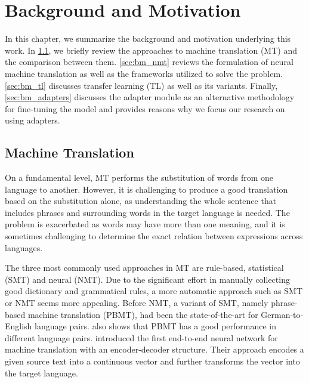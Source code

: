 \chapter{Background and Motivation}

In this chapter, we summarize the background and motivation underlying this work. In \cref{sec:bm_smt}, we briefly review the approaches to machine translation (MT) and the comparison between them.
\cref{sec:bm_nmt} reviews the formulation of neural machine translation as well as the frameworks utilized to solve the problem.
\cref{sec:bm_tl} discusses transfer learning (TL) as well as its variants.
Finally, \cref{sec:bm_adapters} discusses the adapter module as an alternative methodology for fine-tuning the model and provides reasons why we focus our research on using adapters.

\section{Machine Translation}
\label{sec:bm_smt}
On a fundamental level, MT performs the substitution of words from one language to another. However, it is challenging to produce a good translation based on the substitution alone, as understanding the whole sentence that includes phrases and surrounding words in the target language is needed. The problem is exacerbated as words may have more than one meaning, and it is sometimes challenging to determine the exact relation between expressions across languages.

The three most commonly used approaches in MT are rule-based, statistical (SMT) and neural (NMT). Due to the significant effort in manually collecting good dictionary and grammatical rules, a more automatic approach such as SMT or NMT seems more appealing.
Before NMT, a variant of SMT, namely phrase-based machine translation (PBMT), had been the state-of-the-art for German-to-English language pairs.  also shows that PBMT has a good performance in different language pairs.  introduced the first end-to-end neural network for machine translation with an encoder-decoder structure. Their approach encodes a given source text into a continuous vector and further transforms the vector into the target language.


